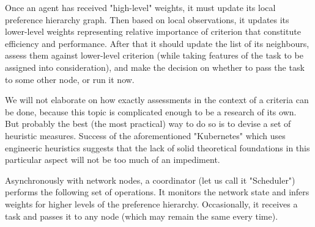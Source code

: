 Once an agent has received "high-level" weights, it must update its local preference hierarchy graph.
Then based on local observations, it updates its lower-level weights representing relative importance of criterion that constitute efficiency and performance.
After that it should update the list of its neighbours, assess them against lower-level criterion (while taking features of the task to be assigned into consideration), and make the decision on whether to pass the task to some other node, or run it now.

We will not elaborate on how exactly assessments in the context of a criteria can be done, because this topic is complicated enough to be a research of its own.
But probably the best (the most practical) way to do so is to devise a set of heuristic measures.
Success of the aforementioned "Kubernetes" which uses engineeric heuristics suggests that the lack of solid theoretical foundations in this particular aspect will not be too much of an impediment.


Asynchronously with network nodes, a coordinator (let us call it "Scheduler") performs the following set of operations. It monitors the network state and infers weights for higher levels of the preference hierarchy. Occasionally, it receives a task and passes it to any node (which may remain the same every time).
